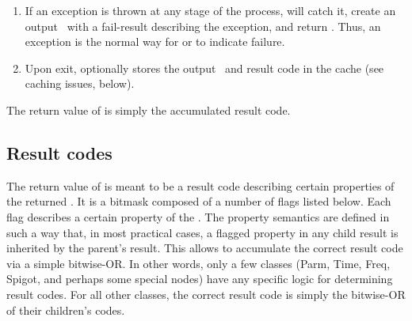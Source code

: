 \documentclass[10pt]{article}
\begin{document}
\begin{enumerate}
  \item If an exception is thrown at any stage of the process, 
    will catch it, create an output \Result\ with a fail-result describing the
    exception, and return . Thus, an exception is the normal way for
     or  to indicate failure.
    
  \item Upon exit, optionally stores the output \Result\ and result code in the
    cache (see caching issues, below).

  \end{enumerate}

  The return value of  is simply the accumulated result code.
  
\subsection{Result codes}

  The return value of  is meant to be a result code describing
  certain properties  of the returned \Result. It is a bitmask composed of a
  number of flags listed below. Each flag describes a certain property of the
  \Result. The property semantics are defined in such a way that, in most
  practical cases, a flagged property in any child result is inherited by the
  parent's result. This allows  to accumulate the correct result
  code via a simple bitwise-OR. In other words, only a few classes (Parm, Time,
  Freq, Spigot, and perhaps some special nodes) have any specific logic for
  determining result codes. For all other classes, the correct result code is
  simply the bitwise-OR of their children's codes.
  
\end{document}
